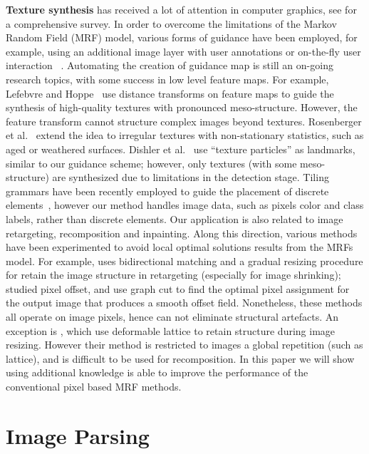 \documentclass{acmtog}
\begin{document}
\textbf{Texture synthesis} has received a lot of attention in computer graphics, see \cite{Wei2009STAR} for a comprehensive survey. In order to overcome the limitations of the Markov Random Field (MRF) model, various forms of guidance have been employed, for example, using an additional image layer with user annotations \cite{Hertzmann2001IA} or on-the-fly user interaction ~\cite{Barnes2009,Hu2013PPI}. Automating the creation of guidance map is still an on-going research topics, with some success in low level feature maps. For example, Lefebvre and Hoppe~ use distance transforms on feature maps to guide the synthesis of high-quality textures with pronounced meso-structure. However, the feature transform cannot structure complex images beyond textures. Rosenberger et al.~ extend the idea to irregular textures with non-stationary statistics, such as aged or weathered surfaces. Dishler et al.~ use ``texture particles'' as landmarks, similar to our guidance scheme; however, only textures (with some meso-structure) are synthesized due to limitations in the detection stage. Tiling grammars have been recently employed to guide the placement of discrete elements~\cite{Ma2011DET,Ma2013DET}, however our method handles image data, such as pixels color and class labels, rather than discrete elements. Our application is also related to image retargeting, recomposition and inpainting. Along this direction, various methods have been experimented to avoid local optimal solutions results from the MRFs model. For example, \cite{Simakov2008SV} uses bidirectional matching and a gradual resizing procedure for retain the image structure in retargeting (especially for image shrinking); \cite{Pritch09ICCV,He2012PO} studied pixel offset, and use graph cut to find the optimal pixel assignment for the output image that produces a smooth offset field. Nonetheless, these methods all operate on image pixels, hence can not eliminate structural artefacts. An exception is \cite{Wu2010SS}, which use deformable lattice to retain structure during image resizing. However their method is restricted to images  a global repetition (such as lattice), and is difficult to be used for recomposition. In this paper we will show using additional  knowledge is able to improve the performance of the conventional pixel based MRF methods. 

\section{Image Parsing}
\label{sec:ImageParsing}
\end{document}
